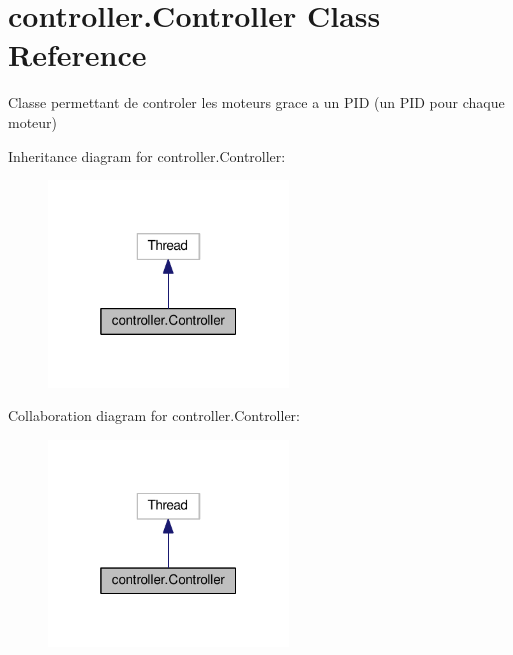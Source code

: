\hypertarget{classcontroller_1_1Controller}{}\section{controller.\+Controller Class Reference}
\label{classcontroller_1_1Controller}


Classe permettant de controler les moteurs grace a un P\+ID (un P\+ID pour chaque moteur)  




Inheritance diagram for controller.\+Controller\+:
\nopagebreak
\begin{figure}[H]
\begin{center}
\leavevmode
\includegraphics[width=181pt]{classcontroller_1_1Controller__inherit__graph}
\end{center}
\end{figure}


Collaboration diagram for controller.\+Controller\+:
\nopagebreak
\begin{figure}[H]
\begin{center}
\leavevmode
\includegraphics[width=181pt]{classcontroller_1_1Controller__coll__graph}
\end{center}
\end{figure}
